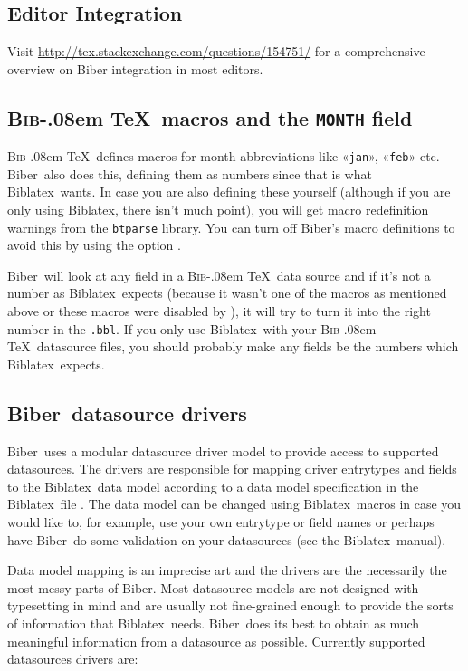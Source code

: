 \documentclass{ltxdockit}
\def\BibTeX{\textsc{Bib}\kern-.08em \TeX}
\newcommand*{\biber}{Biber\xspace}
\newcommand*{\biblatex}{Biblatex\xspace}
\begin{document}
\subsection{Editor Integration}

Visit \url{http://tex.stackexchange.com/questions/154751/} for a
comprehensive overview on \biber integration in most editors.

\subsection{\BibTeX\ macros and the \texttt{MONTH} field}

\BibTeX\ defines macros for month abbreviations
like «\verb+jan+», «\verb+feb+» etc. \biber\ also does this,
defining them as numbers since that is what \biblatex\ wants. In
case you are also defining these yourself (although if you are only
using \biblatex, there isn't much point), you will get macro
redefinition warnings from the \verb+btparse+ library. You can turn
off \biber's macro definitions to avoid this by using the option
.

\biber\ will look at any  field in a \BibTeX\ data
source and if it's not a number as \biblatex\ expects (because it
wasn't one of the macros as mentioned above or these macros were disabled
by ), it will try to turn it into the right number in
the \verb+.bbl+. If you only use \biblatex\ with your \BibTeX\
datasource files, you should probably make any  fields be the
numbers which \biblatex\ expects.

\subsection{\biber\ datasource drivers}\label{dsd}

\biber\ uses a modular datasource driver model to provide access
to supported datasources. The drivers are responsible for mapping
driver entrytypes and fields to the \biblatex\ data model according to a
data model specification in the \biblatex\ file \file{blx-dm.def}. The
data model can be changed using \biblatex\ macros in case you would
like to, for example, use your own entrytype or field names or perhaps
have \biber\ do some validation on your datasources (see the \biblatex\
manual). 

Data model mapping is an imprecise art and the drivers are the
necessarily the most messy parts of \biber. Most datasource models are
not designed with typesetting in mind and are usually not fine-grained
enough to provide the sorts of information that \biblatex\
needs. \biber\ does its best to obtain as much meaningful information
from a datasource as possible. Currently supported datasources
drivers are:
\end{document}
